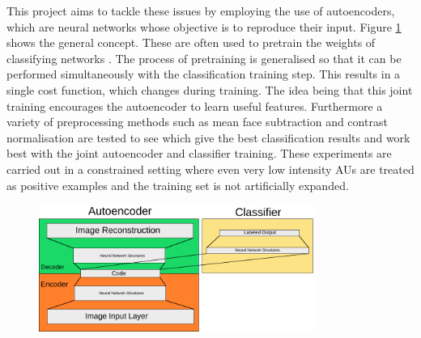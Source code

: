   This project aims to tackle these issues by employing the use of autoencoders,
  which are neural networks whose objective is to reproduce their input. Figure \ref{fig:idea} shows
  the general concept.
  These are often used to pretrain the weights of classifying networks \cite{googlepretrain}.
  The process of pretraining is generalised so that it can be performed simultaneously with
  the classification training step. This results in a single cost function, which changes during training.
  The idea being that this joint training
  encourages the autoencoder to learn useful features. Furthermore a variety of preprocessing methods such as mean face subtraction and contrast normalisation
  are tested to see which give the best classification results and work best with the joint
  autoencoder and classifier training. These experiments are carried out in a constrained setting
  where even very low intensity AUs are treated as positive examples and the training set is not artificially expanded.

  \begin{figure}
   \centering
   \includegraphics[width=0.8\textwidth]{illustrations/simple_network.pdf}
    \label{fig:idea}
  \end{figure}

